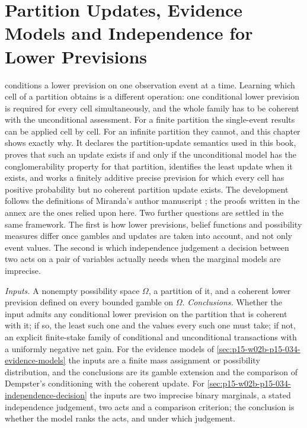 \chapter{Partition Updates, Evidence Models and Independence for Lower Previsions}
\label{sec:p15-w02b-p15-034-partition-updates}

 conditions a lower prevision on one
observation event at a time. Learning which cell of a partition obtains is
a different operation: one conditional lower prevision is required for every
cell simultaneously, and the whole family has to be coherent with the
unconditional assessment. For a finite partition the single-event results
can be applied cell by cell. For an infinite partition they cannot, and
this chapter shows exactly why. It declares the partition-update semantics
used in this book, proves that such an update exists if and only if the
unconditional model has the conglomerability property for that partition,
identifies the least update when it exists, and works a finitely additive
precise prevision for which every cell has positive probability but no
coherent partition update exists. The development follows the definitions
of Miranda's author manuscript
\cite[author manuscript, §§3.1--3.3, pp.~17--24]{MirandaCoherentLowerPrevisionsCapture};
the proofs written in the annex are the ones relied upon here.
Two further questions are settled in the same framework. The first is how
lower previsions, belief functions and possibility measures differ once
gambles and updates are taken into account, and not only event values. The
second is which independence judgement a decision between two acts on a
pair of variables actually needs when the marginal models are imprecise.

\emph{Inputs.} A nonempty possibility space \(\Omega\), a partition of it,
and a coherent lower prevision defined on every bounded gamble on
\(\Omega\). \emph{Conclusions.} Whether the input admits any conditional
lower prevision on the partition that is coherent with it; if so, the
least such one and the values every such one must take; if not, an explicit
finite-stake family of conditional and unconditional transactions with a
uniformly negative net gain. For the evidence models of
\cref{sec:p15-w02b-p15-034-evidence-models} the inputs are a finite
mass assignment or possibility distribution, and the conclusions are its
gamble extension and the comparison of Dempster's conditioning with the
coherent update. For \cref{sec:p15-w02b-p15-034-independence-decision} the
inputs are two imprecise binary marginals, a stated independence judgement,
two acts and a comparison criterion; the conclusion is whether the model
ranks the acts, and under which judgement.

